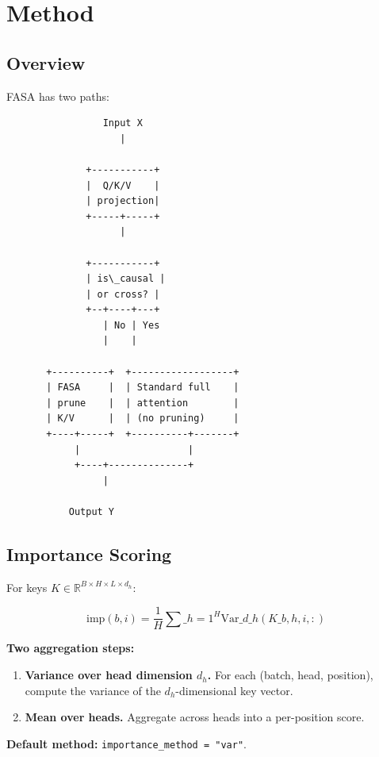
\section{Method}

\subsection{Overview}

FASA has two paths:

\begin{lstlisting}
                 Input X
                    |
                     
              +-----------+
              |  Q/K/V    |
              | projection|
              +-----+-----+
                    |
                     
              +-----------+
              | is\_causal |
              | or cross? |
              +--+----+---+
                 | No | Yes
                 |    |
                       
       +----------+  +------------------+
       | FASA     |  | Standard full    |
       | prune    |  | attention        |
       | K/V      |  | (no pruning)     |
       +----+-----+  +----------+-------+
            |                   |
            +----+--------------+
                 |
                  
           Output Y
\end{lstlisting}

\subsection{Importance Scoring}

For keys $K \in \mathbb{R}^{B \times H \times L \times d_h}$:

\[
\text{imp}(b, i) = \frac{1}{H} \sum\_{h=1}^{H} \text{Var}\_{d\_h}(K\_{b,h,i,:})
\tag{4.1}
\]

\textbf{Two aggregation steps:}
\begin{enumerate}
\item \textbf{Variance over head dimension $d_h$.} For each (batch, head, position),
  compute the variance of the $d_h$-dimensional key vector.
\item \textbf{Mean over heads.} Aggregate across heads into a per-position score.

\end{enumerate}
\textbf{Default method:} \texttt{importance\_method = "var"}.

